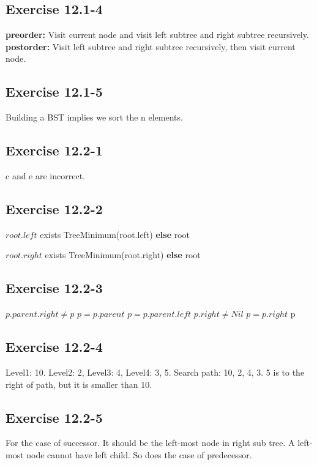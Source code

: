 \documentclass[12pt]{article}
\theoremstyle{definition}
\theoremstyle{remark}
\begin{document}
\subsection*{Exercise 12.1-4}
\textbf{preorder:} Visit current node and visit left subtree and right subtree recursively.\\
\textbf{postorder:} Visit left subtree and right subtree recursively, then visit current node.
\subsection*{Exercise 12.1-5}
Building a BST implies we sort the n elements.
\subsection*{Exercise 12.2-1}
c and e are incorrect.
\subsection*{Exercise 12.2-2}
\begin{codebox}
\li \If $root.left$ exists \label{li:if}
\li \quad \Return TreeMinimum(root.left)
\li \textbf{else}
\li \quad \Return root
\end{codebox}
\begin{codebox}
\li \If $root.right$ exists \label{li:if}
\li \quad \Return TreeMinimum(root.right)
\li \textbf{else}
\li \quad \Return root
\end{codebox}
\subsection*{Exercise 12.2-3}
\begin{codebox}
\li \While $p.parent.right\ne p$ \label{li:while}
\li \quad $p=p.parent$
\li $p=p.parent.left$
\li \While $p.right\ne Nil$
\li \quad $p=p.right$
\li \Return p
\end{codebox}
\subsection*{Exercise 12.2-4}
Level1: 10. Level2: 2, Level3: 4, Level4: 3, 5. Search path: 10, 2, 4, 3. 5 is to the right of path, but it is smaller than 10.
\subsection*{Exercise 12.2-5}
For the case of successor. It should be the left-most node in right sub tree. A left-most node cannot have left child. So does the case of predecessor.
\end{document}
